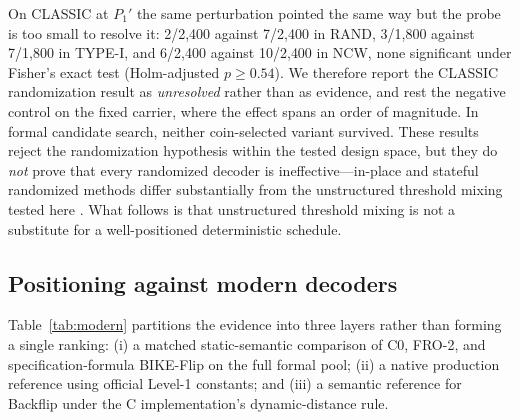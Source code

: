 \documentclass[lettersize,journal]{IEEEtran}
\begin{document}
On CLASSIC at $P_1'$ the same perturbation pointed the same way but the probe is too small to resolve it: 2/2{,}400 against 7/2{,}400 in RAND, 3/1{,}800 against 7/1{,}800 in TYPE-I, and 6/2{,}400 against 10/2{,}400 in NCW, none significant under Fisher's exact test (Holm-adjusted $p\ge 0.54$). We therefore report the CLASSIC randomization result as \emph{unresolved} rather than as evidence, and rest the negative control on the fixed carrier, where the effect spans an order of magnitude. In formal candidate search, neither coin-selected variant survived. These results reject the randomization hypothesis within the tested design space, but they do \emph{not} prove that every randomized decoder is ineffective---in-place and stateful randomized methods differ substantially from the unstructured threshold mixing tested here \cite{baldi2021inplace}. What follows is that unstructured threshold mixing is not a substitute for a well-positioned deterministic schedule.

\subsection{Positioning against modern decoders}\label{sec:modern}

Table~\ref{tab:modern} partitions the evidence into three layers rather than forming a single ranking: (i) a matched static-semantic comparison of C0, FRO-2, and specification-formula BIKE-Flip on the full formal pool; (ii) a native production reference using official Level-1 constants; and (iii) a semantic reference for Backflip under the C implementation's dynamic-distance rule.
\end{document}
